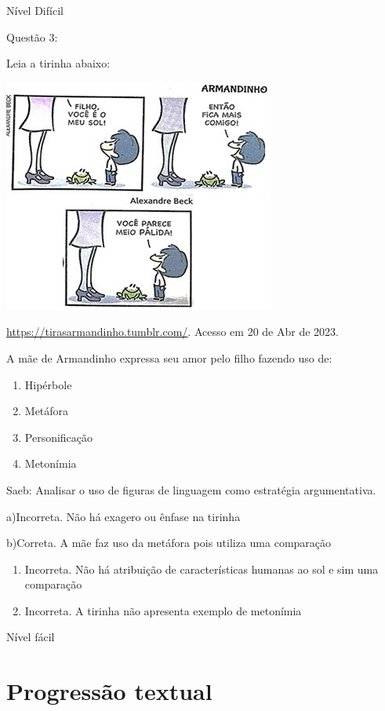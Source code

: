{Nível Difícil

Questão 3:

Leia a tirinha abaixo:

\includegraphics[width=3.51042in,height=3.02083in]{./imgSAEB_7_POR/media/image14.png}

\href{https://tirasarmandinho.tumblr.com/}{\uline{https://tirasarmandinho.tumblr.com/}}.
Acesso em 20 de Abr de 2023.

A mãe de Armandinho expressa seu amor pelo filho fazendo uso de:

\begin{enumerate}
\def\labelenumi{\alph{enumi})}
\item
  Hipérbole
\item
  Metáfora
\item
  Personificação
\item
  Metonímia
\end{enumerate}

Saeb: Analisar o uso de figuras de linguagem como estratégia
argumentativa.

a)Incorreta. Não há exagero ou ênfase na tirinha

b)Correta. A mãe faz uso da metáfora pois utiliza uma comparação

\begin{enumerate}
\def\labelenumi{\arabic{enumi}.}
\item
  Incorreta. Não há atribuição de características humanas ao sol e sim
  uma comparação
\item
  Incorreta. A tirinha não apresenta exemplo de metonímia
\end{enumerate}

Nível fácil

\pagestyle{port}
\chapter{Progressão textual}

}
